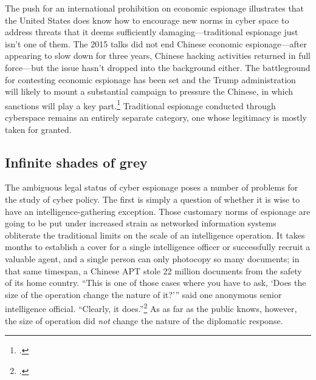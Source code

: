 \documentclass{memoir}
\begin{document}
\begin{refsegment}
The push for an international prohibition on economic espionage illustrates that the United States does know how to encourage new norms in cyber space to address threats that it deems sufficiently damaging---traditional espionage just isn't one of them.  The 2015 talks did not end Chinese economic espionage---after appearing to slow down for three years, Chinese hacking activities returned in full force---but the issue hasn't dropped into the background either. The battleground for contesting economic espionage has been set and the Trump administration will likely to mount a substantial campaign to pressure the Chinese, in which sanctions will play a key part.\footcite{laskai_new_2018} Traditional espionage conducted through cyberspace remains an entirely separate category, one whose legitimacy is mostly taken for granted.

\subsection{Infinite shades of grey}
The ambiguous legal status of cyber espionage poses a number of problems for the study of cyber policy. The first is simply a question of whether it is wise to have an intelligence-gathering exception. Those customary norms of espionage are going to be put under increased strain as networked information systems obliterate the traditional limits on the scale of an intelligence operation. It takes months to establish a cover for a single intelligence officer or successfully recruit a valuable agent, and a single person can only photocopy so many documents; in that same timespan, a Chinese APT stole 22 million documents from the safety of its home country. ``This is one of those cases where you have to ask, `Does the size of the operation change the nature of it?'\thinspace'' said one anonymous senior intelligence official. ``Clearly, it does.''\footcite{sanger_u.s._2015} As as far as the public knows, however, the size of operation did \emph{not} change the nature of the diplomatic response.


\end{refsegment}
\end{document}
